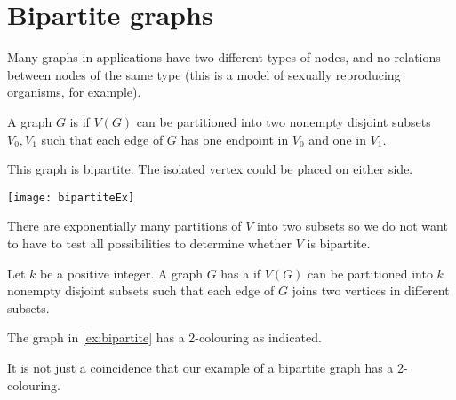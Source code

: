 \chapter{Bipartite graphs} %


Many graphs in applications have two different types of nodes, and no
relations between nodes of the same type (this is a model of sexually
reproducing organisms, for example).

\begin{Definition}
A graph $G$ is  if $V(G)$  can be partitioned into
two nonempty disjoint subsets $V_0, V_1$ such that each edge of $G$
has one endpoint in $V_0$ and one in $V_1$.
\end{Definition}

\begin{Boxample} \label{ex:bipartite}
This graph is bipartite.  
The isolated vertex could be placed on either side.
\begin{center}
\texttt{[image: bipartiteEx]} 
\end{center}
\end{Boxample}


There are exponentially many partitions of $V$ into two subsets so we
do not want to have to test all possibilities to determine whether $V$ is bipartite.

\begin{Definition}
Let $k$ be a positive integer. A graph $G$ has a 
if $V(G)$ can be partitioned into $k$ nonempty disjoint subsets such
that each edge of $G$ joins two vertices in different subsets.
\end{Definition}

\begin{Example}
The graph in \cref{ex:bipartite} has a 2-colouring as indicated.
\end{Example}

It is not just a coincidence that our example of a bipartite graph
has a 2-colouring.


